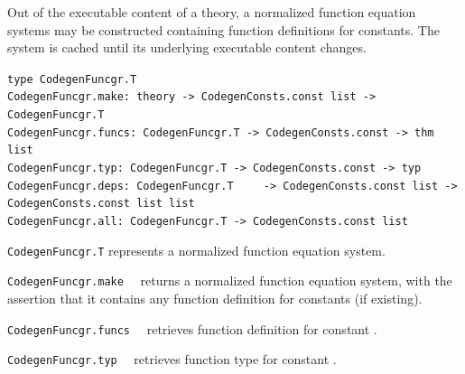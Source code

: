 \begin{isabellebody}
\begin{isamarkuptext}
\begin{description}
  \end{description}%
\end{isamarkuptext}%
\isamarkuptrue%
%
\endisatagmlref
{\isafoldmlref}%
%
\isadelimmlref
%
\endisadelimmlref
%
\isamarkuptrue%
%
\begin{isamarkuptext}%
Out of the executable content of a theory, a normalized
  function equation systems may be constructed containing
  function definitions for constants.  The system is cached
  until its underlying executable content changes.%
\end{isamarkuptext}%
\isamarkuptrue%
%
\isadelimmlref
%
\endisadelimmlref
%
\isatagmlref
%
\begin{isamarkuptext}%
\begin{mldecls}
  \verb|type CodegenFuncgr.T| \\
  \verb|CodegenFuncgr.make: theory -> CodegenConsts.const list -> CodegenFuncgr.T| \\
  \verb|CodegenFuncgr.funcs: CodegenFuncgr.T -> CodegenConsts.const -> thm list| \\
  \verb|CodegenFuncgr.typ: CodegenFuncgr.T -> CodegenConsts.const -> typ| \\
  \verb|CodegenFuncgr.deps: CodegenFuncgr.T|\isasep\isanewline%
\verb|    -> CodegenConsts.const list -> CodegenConsts.const list list| \\
  \verb|CodegenFuncgr.all: CodegenFuncgr.T -> CodegenConsts.const list|
  \end{mldecls}

  \begin{description}

  \item \verb|CodegenFuncgr.T| represents
    a normalized function equation system.

  \item \verb|CodegenFuncgr.make|~~
    returns a normalized function equation system,
    with the assertion that it contains any function
    definition for constants  (if existing).

  \item \verb|CodegenFuncgr.funcs|~~
    retrieves function definition for constant .

  \item \verb|CodegenFuncgr.typ|~~
    retrieves function type for constant .


\end{description}
\end{isamarkuptext}
\end{isabellebody}
